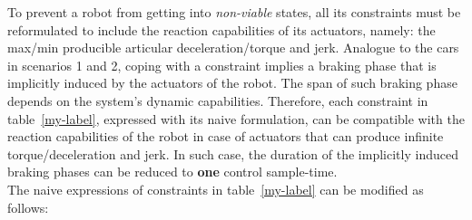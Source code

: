 To prevent a robot from getting into \textit{non-viable} states, all its constraints must be reformulated to include the reaction capabilities of its actuators, namely: the max/min producible articular deceleration/torque and jerk. Analogue to the cars in scenarios 1 and 2, coping with a constraint implies a braking phase that is implicitly induced by the actuators of the robot. The span of such braking phase depends on the system's dynamic capabilities. Therefore, each constraint in table~\ref{my-label}, expressed with its naive formulation, can be compatible with the reaction capabilities of the robot in case of actuators that can produce infinite torque/deceleration and jerk. In such case, the duration of the implicitly induced braking phases can be reduced to \textbf{one} control sample-time. \\
The naive expressions of constraints in table~\ref{my-label} can be modified as follows:\\
